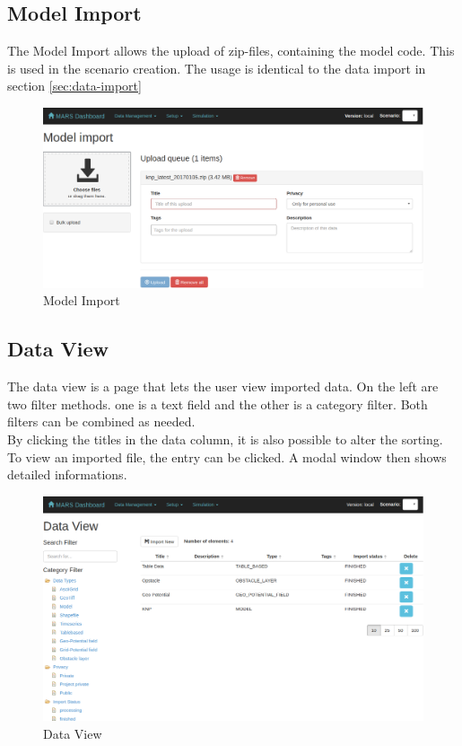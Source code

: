 \subsection{Model Import}
The Model Import allows the upload of zip-files, containing the model code. This is used in the scenario creation. The usage is identical to the data import in section \ref{sec:data-import}
\begin{figure}[H]
	\centering\includegraphics[width=1\textwidth]{res/workflow_model-import}
	\caption{Model Import}
	\label{fig:model-import-ui}
\end{figure}


\subsection{Data View}
The data view is a page that lets the user view imported data. On the left are two filter methods. one is a text field and the other is a category filter. Both filters can be combined as needed.\\
By clicking the titles in the data column, it is also possible to alter the sorting. To view an imported file, the entry can be clicked. A modal window then shows detailed informations.
\begin{figure}[H]
	\centering\includegraphics[width=1\textwidth]{res/workflow_data-view}
	\caption{Data View}
	\label{fig:data-view-ui}
\end{figure}


